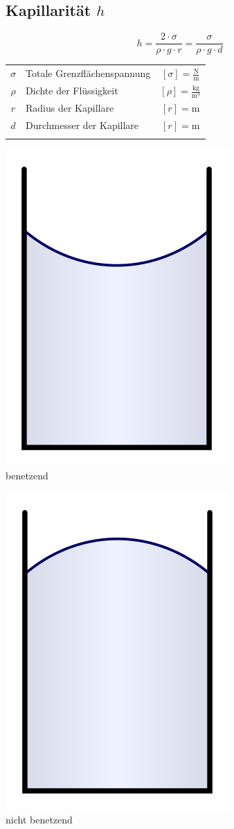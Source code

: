 \subsection{Kapillarität $h$}

$$\boxed{  h = \frac{2 \cdot \sigma}{\rho \cdot g \cdot r} = \frac{\sigma}{\rho \cdot g \cdot d} }$$ 


	\begin{tabular}{c l c}
		\rule{0pt}{10pt}$\sigma$ & Totale Grenzflächenspannung & $[\sigma] = \mathrm{\frac{N}{m}}$ \\
		\rule{0pt}{10pt}$\rho$ & Dichte der Flüssigkeit & $[\rho] = \mathrm{\frac{kg}{m^3}} $ \\
		\rule{0pt}{10pt}$r$ & Radius der Kapillare & $[r] = \mathrm{m}$  \\
		$d$ & Durchmesser der Kapillare & $[r] = \mathrm{m}$  \\
		\\
	\end{tabular}

\begin{minipage}{0.48\linewidth}
\includegraphics[width=0.3\linewidth]{Bilder/kapillaritaet_benetzend} \\

benetzend
\end{minipage}
\hfill
\begin{minipage}{0.48\linewidth}
\includegraphics[width=0.3\linewidth]{Bilder/kapillaritaet_nicht_benetzend} \\

nicht benetzend

\end{minipage}





